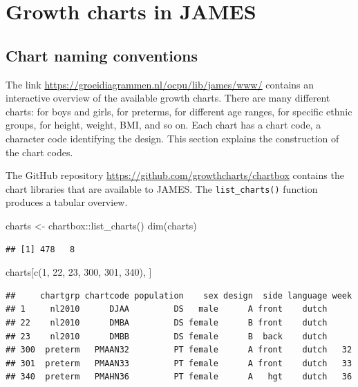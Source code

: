 \documentclass[
]{book}
\newenvironment{Shaded}{\begin{snugshade}}{\end{snugshade}}
\newcommand{\DecValTok}[1]{\textcolor[rgb]{0.00,0.00,0.81}{#1}}
\newcommand{\FunctionTok}[1]{\textcolor[rgb]{0.00,0.00,0.00}{#1}}
\newcommand{\NormalTok}[1]{#1}
\newcommand{\OtherTok}[1]{\textcolor[rgb]{0.56,0.35,0.01}{#1}}
\newcommand{\SpecialCharTok}[1]{\textcolor[rgb]{0.00,0.00,0.00}{#1}}
\begin{document}
\hypertarget{growth-charts-in-james}{%
\chapter{Growth charts in JAMES}\label{growth-charts-in-james}}

\hypertarget{chart-naming-conventions}{%
\section{Chart naming conventions}\label{chart-naming-conventions}}

The link \url{https://groeidiagrammen.nl/ocpu/lib/james/www/} contains an interactive overview of the available growth charts. There are many different charts: for boys and girls, for preterms, for different age ranges, for specific ethnic groups, for height, weight, BMI, and so on. Each chart has a chart code, a character code identifying the design. This section explains the construction of the chart codes.

The GitHub repository \url{https://github.com/growthcharts/chartbox} contains the chart libraries that are available to JAMES. The \texttt{list\_charts()} function produces a tabular overview.

\begin{Shaded}
\begin{Highlighting}[]
\NormalTok{charts }\OtherTok{\textless{}{-}}\NormalTok{ chartbox}\SpecialCharTok{::}\FunctionTok{list\_charts}\NormalTok{()}
\FunctionTok{dim}\NormalTok{(charts)}
\end{Highlighting}
\end{Shaded}

\begin{verbatim}
## [1] 478   8
\end{verbatim}

\begin{Shaded}
\begin{Highlighting}[]
\NormalTok{charts[}\FunctionTok{c}\NormalTok{(}\DecValTok{1}\NormalTok{, }\DecValTok{22}\NormalTok{, }\DecValTok{23}\NormalTok{, }\DecValTok{300}\NormalTok{, }\DecValTok{301}\NormalTok{, }\DecValTok{340}\NormalTok{), ]}
\end{Highlighting}
\end{Shaded}

\begin{verbatim}
##     chartgrp chartcode population    sex design  side language week
## 1     nl2010      DJAA         DS   male      A front    dutch     
## 22    nl2010      DMBA         DS female      B front    dutch     
## 23    nl2010      DMBB         DS female      B  back    dutch     
## 300  preterm   PMAAN32         PT female      A front    dutch   32
## 301  preterm   PMAAN33         PT female      A front    dutch   33
## 340  preterm   PMAHN36         PT female      A   hgt    dutch   36
\end{verbatim}
\end{document}
